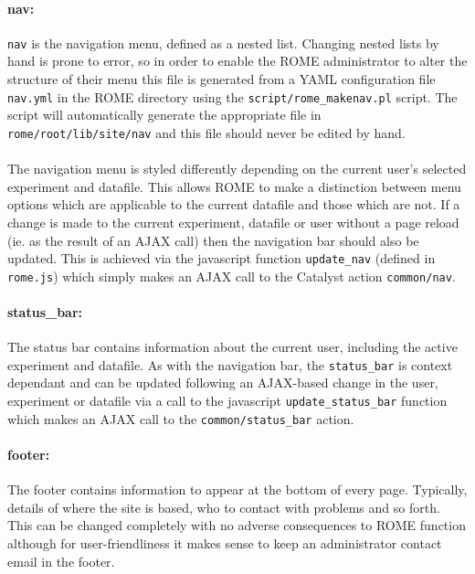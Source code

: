 \paragraph{nav: }
\texttt{nav} is the navigation menu, defined as a nested list. Changing nested lists by hand is prone to error, so in order to enable the ROME administrator to alter the structure of their menu this file is generated from a YAML configuration file \texttt{nav.yml} in the ROME directory using the \texttt{script/rome\_makenav.pl} script. The script will automatically generate the appropriate file in \texttt{rome/root/lib/site/nav} and this file should never be edited by hand.

\paragraph{}
The navigation menu is styled differently depending on the current user's selected experiment and datafile. This allows ROME to make a distinction between menu options which are applicable to the current datafile and those which are not. If a change is made to the current experiment, datafile or user without a page reload (ie. as the result of an AJAX call) then the navigation bar should also be updated. This is achieved via the javascript function \texttt{update\_nav} (defined in \texttt{rome.js}) which simply makes an AJAX call to the Catalyst action \texttt{common/nav}. 

\paragraph{status\_bar: }
The status bar contains information about the current user, including the active experiment and datafile. As with the navigation bar, the \texttt{status\_bar} is context dependant and can be updated following an AJAX-based change in the user, experiment or datafile via a call to the javascript \texttt{update\_status\_bar} function which makes an AJAX call to the \texttt{common/status\_bar} action.


\paragraph{footer: }
The footer contains information to appear at the bottom of every page. Typically, details of where the site is based, who to contact with problems and so forth. This can be changed completely with no adverse consequences to ROME function although for user-friendliness it makes sense to keep an administrator contact email in the footer.





